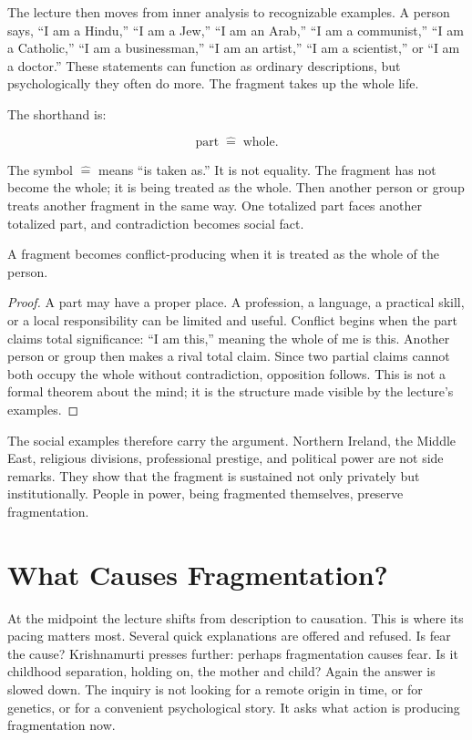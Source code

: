 The lecture then moves from inner analysis to recognizable examples. A person says, ``I am a Hindu,'' ``I am a Jew,'' ``I am an Arab,'' ``I am a communist,'' ``I am a Catholic,'' ``I am a businessman,'' ``I am an artist,'' ``I am a scientist,'' or ``I am a doctor.'' These statements can function as ordinary descriptions, but psychologically they often do more. The fragment takes up the whole life.

The shorthand is:

\begin{equation}
\text{part} \;\widehat{=}\; \text{whole}.
\end{equation}

The symbol \(\widehat{=}\) means ``is taken as.'' It is not equality. The fragment has not become the whole; it is being treated as the whole. Then another person or group treats another fragment in the same way. One totalized part faces another totalized part, and contradiction becomes social fact.

\begin{proposition}
A fragment becomes conflict-producing when it is treated as the whole of the person.
\end{proposition}

\begin{proof}
A part may have a proper place. A profession, a language, a practical skill, or a local responsibility can be limited and useful. Conflict begins when the part claims total significance: ``I am this,'' meaning the whole of me is this. Another person or group then makes a rival total claim. Since two partial claims cannot both occupy the whole without contradiction, opposition follows. This is not a formal theorem about the mind; it is the structure made visible by the lecture's examples.
\end{proof}

The social examples therefore carry the argument. Northern Ireland, the Middle East, religious divisions, professional prestige, and political power are not side remarks. They show that the fragment is sustained not only privately but institutionally. People in power, being fragmented themselves, preserve fragmentation.

\section{What Causes Fragmentation?}

At the midpoint the lecture shifts from description to causation. This is where its pacing matters most. Several quick explanations are offered and refused. Is fear the cause? Krishnamurti presses further: perhaps fragmentation causes fear. Is it childhood separation, holding on, the mother and child? Again the answer is slowed down. The inquiry is not looking for a remote origin in time, or for genetics, or for a convenient psychological story. It asks what action is producing fragmentation now.

